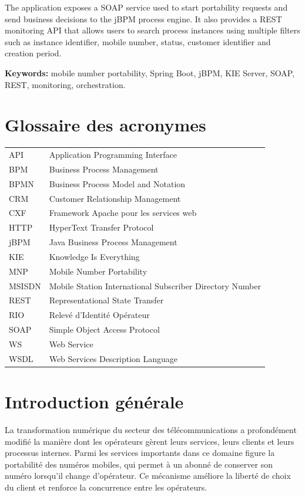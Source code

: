 \documentclass[12pt,a4paper]{report}
\begin{document}
The application exposes a SOAP service used to start portability requests and send business decisions to the jBPM process engine. It also provides a REST monitoring API that allows users to search process instances using multiple filters such as instance identifier, mobile number, status, customer identifier and creation period.

\textbf{Keywords:} mobile number portability, Spring Boot, jBPM, KIE Server, SOAP, REST, monitoring, orchestration.

\chapter*{Glossaire des acronymes}
\begin{longtable}{p{3cm}p{11cm}}
    API & Application Programming Interface\\
    BPM & Business Process Management\\
    BPMN & Business Process Model and Notation\\
    CRM & Customer Relationship Management\\
    CXF & Framework Apache pour les services web\\
    HTTP & HyperText Transfer Protocol\\
    jBPM & Java Business Process Management\\
    KIE & Knowledge Is Everything\\
    MNP & Mobile Number Portability\\
    MSISDN & Mobile Station International Subscriber Directory Number\\
    REST & Representational State Transfer\\
    RIO & Relevé d'Identité Opérateur\\
    SOAP & Simple Object Access Protocol\\
    WS & Web Service\\
    WSDL & Web Services Description Language
\end{longtable}

\tableofcontents
\listoffigures
\listoftables

\clearpage
{}

\chapter*{Introduction générale}
La transformation numérique du secteur des télécommunications a profondément modifié la manière dont les opérateurs gèrent leurs services, leurs clients et leurs processus internes. Parmi les services importants dans ce domaine figure la portabilité des numéros mobiles, qui permet à un abonné de conserver son numéro lorsqu'il change d'opérateur. Ce mécanisme améliore la liberté de choix du client et renforce la concurrence entre les opérateurs.
\end{document}
